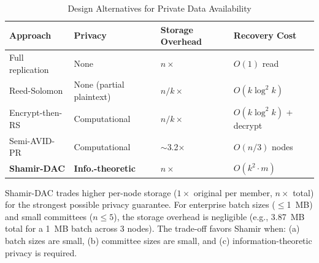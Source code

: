 \begin{table}[h]
\centering
\caption{Design Alternatives for Private Data Availability}
\label{tab:approaches}
\begin{tabular}{lp{1.4cm}p{1.6cm}p{1.6cm}}
\toprule
\textbf{Approach} & \textbf{Privacy} & \textbf{Storage Overhead} & \textbf{Recovery Cost} \\
\midrule
Full replication & None & $n \times$ & $O(1)$ read \\
Reed-Solomon     & None (partial plaintext) & $n/k \times$ & $O(k \log^2 k)$ \\
Encrypt-then-RS  & Computational & $n/k \times$ & $O(k \log^2 k)$ + decrypt \\
Semi-AVID-PR     & Computational & $\sim$3.2$\times$ & $O(n/3)$ nodes \\
\textbf{Shamir-DAC} & \textbf{Info.-theoretic} & $n \times$ & $O(k^2 \cdot m)$ \\
\bottomrule
\end{tabular}
\end{table}

Shamir-DAC trades higher per-node storage ($1\times$ original per member,
$n\times$ total) for the strongest possible privacy guarantee. For enterprise
batch sizes ($\leq$1~MB) and small committees ($n \leq 5$), the storage
overhead is negligible (e.g., 3.87~MB total for a 1~MB batch across 3 nodes).
The trade-off favors Shamir when: (a) batch sizes are small, (b) committee
sizes are small, and (c) information-theoretic privacy is required.
